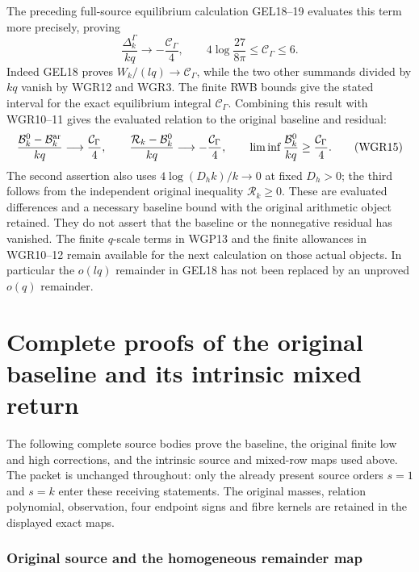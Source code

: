 \documentclass[11pt,a4paper]{article}
\begin{document}
The preceding full-source equilibrium calculation GEL18--19 evaluates
this term more precisely, proving
\[
 \boxed{\frac{\Delta_k^\Gamma}{kq}\longrightarrow
       -\frac{\mathcal C_\Gamma}{4},\qquad
 4\log\frac{27}{8\pi}\le\mathcal C_\Gamma\le6.}
 \tag{WGR14}
\]
Indeed GEL18 proves $W_k/(lq)\to\mathcal C_\Gamma$, while the
two other summands divided by $kq$ vanish by WGR12 and WGR3.
The finite RWB bounds give the stated interval for the exact equilibrium
integral $\mathcal C_\Gamma$. Combining this result with WGR10--11
gives the evaluated relation to the original baseline and residual:
\[
 \frac{\mathcal B_k^0-\mathcal B_k^{\rm ar}}{kq}
       \longrightarrow\frac{\mathcal C_\Gamma}{4},\qquad
 \frac{\mathcal R_k-\mathcal B_k^0}{kq}
       \longrightarrow-\frac{\mathcal C_\Gamma}{4},\qquad
 \liminf\frac{\mathcal B_k^0}{kq}\ge\frac{\mathcal C_\Gamma}{4}.
 \tag{WGR15}
\]
The second assertion also uses $4\log(D_hk)/k\to0$ at fixed $D_h>0$;
the third follows from the independent original inequality
$\mathcal R_k\ge0$. These are evaluated differences and a necessary
baseline bound with the original arithmetic object retained. They do
not assert that the baseline or the nonnegative residual has vanished.
The finite $q$-scale terms in WGP13 and the finite allowances in
WGR10--12 remain available for the next calculation on those actual
objects. In particular the $o(lq)$ remainder in GEL18 has not been
replaced by an unproved $o(q)$ remainder.




\clearpage
\part*{Complete proofs of the original baseline and its intrinsic mixed return}
The following complete source bodies prove the baseline, the original
finite low and high corrections, and the intrinsic source and mixed-row
maps used above. The packet is unchanged throughout: only the already
present source orders $s=1$ and $s=k$ enter these receiving statements.
The original masses, relation polynomial, observation, four endpoint
signs and fibre kernels are retained in the displayed exact maps.




\section{Original source and the homogeneous remainder map}
\end{document}
